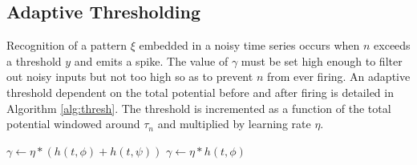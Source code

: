 \documentclass{article}
\begin{document}
\subsection*{Adaptive Thresholding} Recognition of a pattern $\xi$ embedded in a noisy time series occurs when $n$ exceeds a threshold $y$ and emits a spike.  The value of $\gamma$ must be set high enough to filter out noisy inputs but not too high so as to prevent $n$ from ever firing.  An adaptive threshold dependent on the total potential before and after firing is detailed in Algorithm \ref{alg:thresh}.  The threshold is incremented as a function of the total potential windowed around $\tau_n$ and multiplied by learning rate $\eta$.

\begin{algorithm}
\caption{Adaptive Threshold}\label{alg:thresh}
\begin{algorithmic}[1]
\State $\gamma \gets \eta * (h(t,\phi) + h(t,\psi))$
\EndIf
{}
\State $\gamma \gets \eta * h(t,\phi)$
\EndIf
\EndProcedure
\end{algorithmic}
\end{algorithm}

\end{document}
